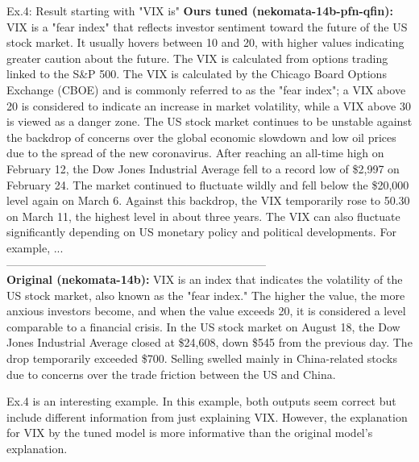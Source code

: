 \begin{brekableitembox}{Ex.4: Result starting with "VIX is"}
    {\bf Ours tuned (nekomata-14b-pfn-qfin):}
    VIX is a "fear index" that reflects investor sentiment toward the future of the US stock market. It usually hovers between 10 and 20, with higher values indicating greater caution about the future.
    The VIX is calculated from options trading linked to the S\&P 500. The VIX is calculated by the Chicago Board Options Exchange (CBOE) and is commonly referred to as the "fear index"; a VIX above 20 is considered to indicate an increase in market volatility, while a VIX above 30 is viewed as a danger zone.
    The US stock market continues to be unstable against the backdrop of concerns over the global economic slowdown and low oil prices due to the spread of the new coronavirus. After reaching an all-time high on February 12, the Dow Jones Industrial Average fell to a record low of \$2,997 on February 24. The market continued to fluctuate wildly and fell below the \$20,000 level again on March 6. Against this backdrop, the VIX temporarily rose to 50.30 on March 11, the highest level in about three years. The VIX can also fluctuate significantly depending on US monetary policy and political developments. For example, ...\\
    ---------------------------------------------------------------------\\
    {\bf Original (nekomata-14b):}
    VIX is an index that indicates the volatility of the US stock market, also known as the "fear index." The higher the value, the more anxious investors become, and when the value exceeds 20, it is considered a level comparable to a financial crisis.
    In the US stock market on August 18, the Dow Jones Industrial Average closed at \$24,608, down \$545 from the previous day. The drop temporarily exceeded \$700. Selling swelled mainly in China-related stocks due to concerns over the trade friction between the US and China.
\end{brekableitembox}

Ex.4 is an interesting example.
In this example, both outputs seem correct but include different information from just explaining VIX.
However, the explanation for VIX by the tuned model is more informative than the original model's explanation.

